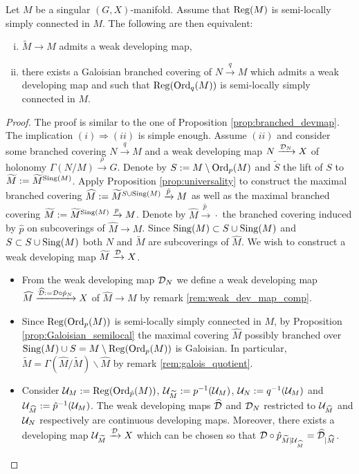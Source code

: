 \begin{prop} \label{prop:branched_weak_devmap}Let $M$ be a singular $(G,X)$-manifold. Assume that $\mathrm{Reg}(M)$ is semi-locally simply connected in $M$.
The following are then equivalent:
\begin{enumerate}[(i)]
 \item  $\widetilde M\rightarrow M$ admits a weak developing map,
 \item there exists a Galoisian branched covering of $N\xrightarrow{q} M$ which admits a weak developing map and such that $\mathrm{Reg}(\mathrm{Ord}_{q}(M))$ is semi-locally simply connected in $M$.
\end{enumerate} 
\end{prop}
\begin{proof} The proof is similar to the one of Proposition \ref{prop:branched_devmap}. The implication
  $(i)\Rightarrow (ii)$ is simple enough.  Assume $(ii)$ and consider some branched covering $N\xrightarrow{q}M$  and a weak developing map $N\xrightarrow{\mathcal{D}_N} X$ of holonomy $\Gamma(N/M)\xrightarrow{\rho} G$. Denote by $S:=M\setminus \mathrm{Ord}_p(M)$ and $\widetilde S$  the lift of $S$ to $\widetilde M:=\widetilde M^{\mathrm{Sing}(M)}$.   
 Apply Proposition \ref{prop:universality} to  construct the maximal branched covering $\widehat M := \widetilde M^{S\cup \mathrm{Sing}(M)}\xrightarrow{\hat p} M$ as well as the maximal branched covering $\widetilde M:=\widetilde M^{\mathrm{Sing}(M)} \xrightarrow{p} M$. Denote by $\widehat M \xrightarrow{\hat p_{\cdot}} \cdot$ the branched covering induced by $\hat p$ on subcoverings of $\widehat M\rightarrow M$. Since $\mathrm{Sing}(M)\subset S\cup \mathrm{Sing}(M)$ and $S\subset S\cup \mathrm{Sing}(M)$ both $N$ and $\widetilde M$ are subcoverings of $\widehat M$. We wish to construct a weak developing map $\widetilde M \xrightarrow{\mathcal{D}} X$. 
 \begin{itemize}
 \item  From the weak developing map $\mathcal{D}_N$ we define a weak developing map $\widehat M \xrightarrow{\widehat {\mathcal{D}} :=\mathcal{D}\circ \hat p_N} X$ of $\widehat M\rightarrow M$ by remark \ref{rem:weak_dev_map_comp}.
\item  Since $\mathrm{Reg}(\mathrm{Ord}_p(M))$ is semi-locally simply connected in $M$, by Proposition \ref{prop:Galoisian_semilocal} the maximal covering $\widehat M$ possibly branched over $\mathrm{Sing}(M)\cup S = M\setminus \mathrm{Reg}(\mathrm{Ord}_p(M))$ is Galoisian. In particular, $\widetilde M = \Gamma(\widehat M/\widetilde M)\backslash\widehat M$ by remark \ref{rem:galois_quotient}.
\item Consider $\mathcal{U}_M:= \mathrm{Reg}(\mathrm{Ord}_{\hat p}(M))$, $\mathcal{U}_{\widetilde M}:=p^{-1}(\mathcal{U}_M)$, $\mathcal{U}_{N}:=q^{-1}(\mathcal{U}_M)$ and $\mathcal{U}_{\widehat M}:=\hat p^{-1}(\mathcal{U}_M)$. The weak developing maps $\widehat {\mathcal{D}}$ and $\mathcal{D}_N$ restricted to $\mathcal{U}_{\widehat M}$ and $\mathcal{U}_{N}$ respectively are continuous developing maps. Moreover, there exists a developing map $\mathcal{U}_{\widetilde M}\xrightarrow{\mathcal{D}}X$ which can be chosen so that $\mathcal{D}\circ \hat p_{\widetilde M|\mathcal{U}_{\widehat M}}= \widehat {\mathcal{D}}_{|\widehat M}$. 


\end{itemize}
\end{proof}
